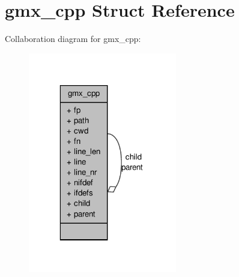 \hypertarget{structgmx__cpp}{\section{gmx\-\_\-cpp \-Struct \-Reference}
\label{structgmx__cpp}
}


\-Collaboration diagram for gmx\-\_\-cpp\-:
\nopagebreak
\begin{figure}[H]
\begin{center}
\leavevmode
\includegraphics[width=184pt]{structgmx__cpp__coll__graph}
\end{center}
\end{figure}
